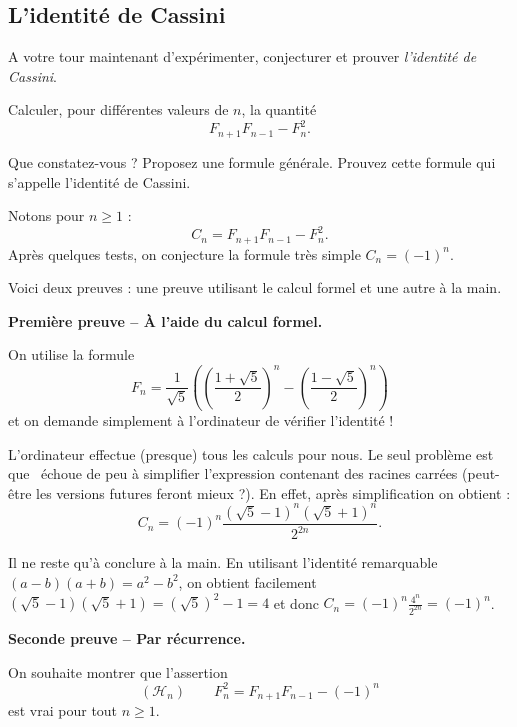 \documentclass[class=report,crop=false]{standalone}
\begin{document}
\subsection{L'identité de Cassini}


A votre tour maintenant d'expérimenter, conjecturer et prouver 
\emph{l'identité de Cassini}.
\begin{tp}
Calculer, pour différentes valeurs de $n$, la quantité
$$F_{n+1}F_{n-1}-F_n^2.$$

Que constatez-vous ? 
Proposez une formule générale.
Prouvez cette formule qui s'appelle l'identité de Cassini.   
\end{tp}


Notons pour $n \ge 1$ :
$$C_n = F_{n+1}F_{n-1}-F_n^2.$$
Après quelques tests, on conjecture la formule très simple $C_n = (-1)^n$.
  
Voici deux preuves : une preuve utilisant le calcul formel
et une autre à la main.

\textbf{Première preuve -- \`A l'aide du calcul formel.}


On utilise la formule   
$$F_n = \frac{1}{\sqrt5}\left(\left(\frac{1+\sqrt5}{2}\right)^n- 
  \left(\frac{1-\sqrt5}{2}\right)^n\right)$$
et on demande simplement à l'ordinateur de vérifier l'identité !




L'ordinateur effectue (presque) tous les calculs pour nous.
Le seul problème est que \Sage\ échoue de peu à simplifier l'expression 
contenant des racines carrées (peut-être les versions futures feront mieux ?).
En effet, après simplification on obtient :
$$C_n = (-1) ^n \frac{(\sqrt 5 -1)^n (\sqrt 5 + 1)^n}{2^{2n}}.$$

Il ne reste qu'à conclure à la main. 
En utilisant l'identité remarquable $(a-b)(a+b)=a^2-b^2$,
on obtient facilement $(\sqrt 5 -1)(\sqrt 5 + 1) = (\sqrt 5)^2 - 1 = 4$
et donc $C_n = (-1) ^n \frac{4^n}{2^{2n}} = (-1)^n$.

\bigskip

\textbf{Seconde preuve -- Par récurrence.}

On souhaite montrer que l'assertion
$$(\mathcal{H}_n) \qquad F_n^2 = F_{n+1}F_{n-1} - (-1)^n$$
est vrai pour tout $n \ge 1$.
\end{document}
